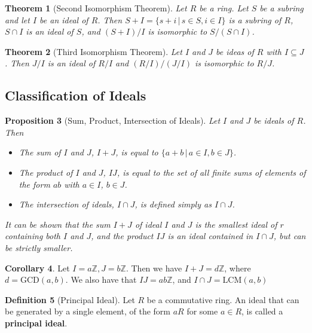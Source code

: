 \documentclass[10pt, oneside, reqno]{amsart}
\theoremstyle{plain}%
\newtheorem{thm}{Theorem}[section]
\newtheorem{prop}[thm]{Proposition}
\theoremstyle{definition}
\newtheorem{defn}[thm]{Definition}
\newtheorem{cor}[thm]{Corollary}
\theoremstyle{remark}
\newcommand{\Z}{\mathbb{Z}}
\begin{document}
\begin{thm}[Second Isomorphism Theorem]
    Let $R$ be a ring. Let $S$ be a subring and let $I$ be an ideal of $R$.  Then $S + I = \{ s + i \, | \, s \in S, i \in I \}$ is a subring of $R$, $S \cap I$ is an ideal of $S$, and $(S + I)/I$ is isomorphic to $S/(S \cap I)$.
\end{thm}

\begin{thm}[Third Isomorphism Theorem]
    Let $I$ and $J$ be ideas of $R$ with $I \subseteq J$.  Then $J/I$ is an ideal of $R/I$ and $(R/I)/(J/I)$ is isomorphic to $R/J$. 
\end{thm}


\subsection{Classification of Ideals} %
\label{sub:classification_of_ideals}

\begin{prop}[Sum, Product, Intersection of Ideals]
    Let $I$ and $J$ be ideals of $R$.  Then
    \begin{itemize}
        \item The sum of $I$ and $J$, $I + J$, is equal to $\{ a + b \, | \, a \in I, b \in J \}$.
        \item The product of $I$ and $J$, $IJ$, is equal to the set of all finite sums of elements of the form $ab$ with $a \in I$, $b \in J$.
        \item The intersection of ideals, $I \cap J$, is defined simply as $I \cap J$.
    \end{itemize}

    It can be shown that the sum $I + J$ of ideal $I$ and $J$ is the smallest ideal of $r$ containing both $I$ and $J$, and the product $IJ$ is an ideal contained in $I \cap J$, but can be strictly smaller.
\end{prop}

\begin{cor}
    Let $I = a\Z, J = b\Z$.  Then we have $I + J = d\Z$, where $d  = \text{GCD}(a,b)$.  We also have that $IJ = ab \Z$, and $I \cap J = \text{LCM}(a,b)$ 
\end{cor}
\begin{defn}[Principal Ideal]
    Let $R$ be a commutative ring.  An ideal that can be generated by a single element, of the form $aR$ for some $a \in R$, is called a \textbf{principal ideal}. 
\end{defn}
\end{document}
